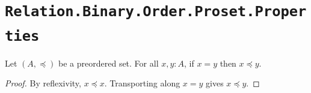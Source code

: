 \section{\texttt{Relation.Binary.Order.Proset.Properties}}

\begin{lemma}
  \label{eqWeakenLe}
  Let $(A, \preceq)$ be a preordered set. For all $x, y : A$, if $x = y$ then $x \preceq y$.
\end{lemma}
\begin{proof}
  By reflexivity, $x \preceq x$. Transporting along $x = y$ gives $x \preceq y$.
\end{proof}
